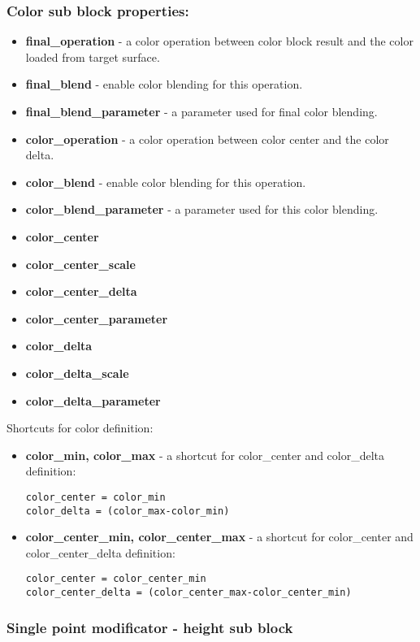 \documentclass[9pt]{article}
\begin{document}
\subsubsection*{Color sub block properties:}
\begin{itemize}
\item{\bf final\_operation} - a color operation between color block result and
the color loaded from target surface.
\item{\bf final\_blend} - enable color blending for this operation.
\item{\bf final\_blend\_parameter} - a parameter used for final color blending.
\item{\bf color\_operation} - a color operation between color center and
the color delta.
\item{\bf color\_blend} - enable color blending for this operation.
\item{\bf color\_blend\_parameter} - a parameter used for this color blending.
\item{\bf color\_center}
\item{\bf color\_center\_scale}
\item{\bf color\_center\_delta}
\item{\bf color\_center\_parameter}
\item{\bf color\_delta}
\item{\bf color\_delta\_scale}
\item{\bf color\_delta\_parameter}
\end{itemize}
Shortcuts for color definition:
\begin{itemize}
\item{\bf color\_min, color\_max} - a shortcut for color\_center and color\_delta
definition:
\begin{verbatim}
color_center = color_min
color_delta = (color_max-color_min)
\end{verbatim}
\item{\bf color\_center\_min, color\_center\_max} - a shortcut for color\_center
and color\_center\_delta definition:
\begin{verbatim}
color_center = color_center_min
color_center_delta = (color_center_max-color_center_min)
\end{verbatim}
\end{itemize}

\subsubsection{Single point modificator - height sub block}
\end{document}
